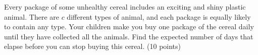 \documentclass[fleqn]{homework}
\begin{document}
  \begin{problem}{5}
    \begin{question}
      Every package of some unhealthy cereal includes an exciting and shiny
      plastic animal.  There are $c$ different types of animal, and each package
      is equally likely to contain any type.  Your children make you buy one
      package of the cereal daily until they have collected all the animals.
      Find the expected number of days that elapse before you can stop buying
      this cereal. (10 points)
    \end{question}
  \end{problem}
\end{document}
